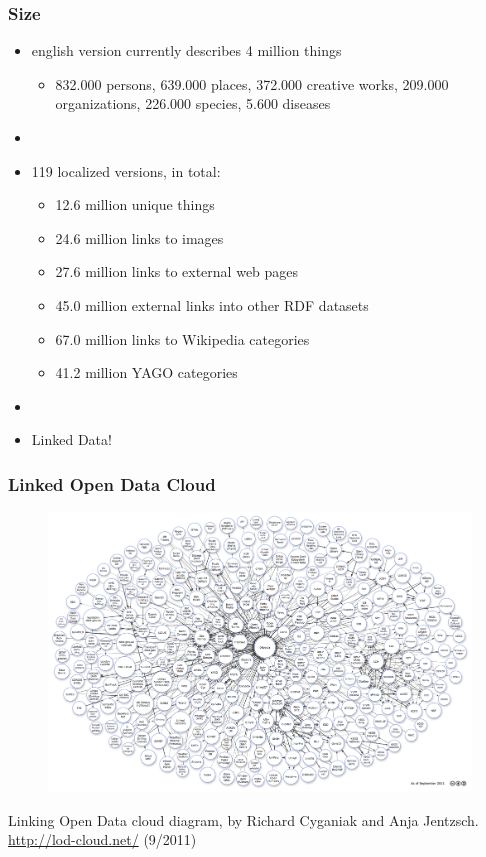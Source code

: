 \begin{frame}
\begin{minipage}{0.25\textwidth}
\end{minipage}
\end{frame}

\begin{frame}
\frametitle{Size}
\begin{itemize}
  \item english version currently describes 4 million things
  \begin{itemize}
    \item 832.000 persons, 639.000 places,
    372.000 creative works, 209.000 organizations, 226.000 species, 5.600
    diseases
    \end{itemize}
  \item[]
  \item 119 localized versions, in total:
  \begin{itemize}
    \item  12.6 million unique things
    \item 24.6 million links to images
    \item 27.6 million links to external web
    pages
    \item 45.0 million external links into other RDF datasets
    \item 67.0 million links to Wikipedia categories
    \item 41.2 million YAGO categories
  \end{itemize}
  \item[]
  \item Linked Data!
\end{itemize}
\end{frame}

\begin{frame}
\frametitle{Linked Open Data Cloud}
\centering
\begin{figure}
\includegraphics[scale=0.15]{img/lod-cloud.png} 
\end{figure}
\small Linking Open Data cloud diagram, by Richard Cyganiak and Anja Jentzsch.
\url{http://lod-cloud.net/} (9/2011)
\end{frame}


